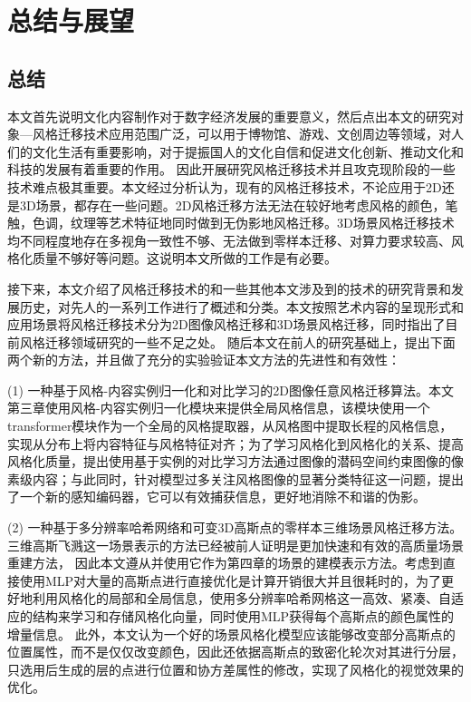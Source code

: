 \chapter{总结与展望}
\section{总结}
本文首先说明文化内容制作对于数字经济发展的重要意义，然后点出本文的研究对象—风格迁移技术应用范围广泛，可以用于博物馆、游戏、文创周边等领域，对人们的文化生活有重要影响，对于提振国人的文化自信和促进文化创新、推动文化和科技的发展有着重要的作用。
因此开展研究风格迁移技术并且攻克现阶段的一些技术难点极其重要。本文经过分析认为，现有的风格迁移技术，不论应用于2D还是3D场景，都存在一些问题。2D风格迁移方法无法在较好地考虑风格的颜色，笔触，色调，纹理等艺术特征地同时做到无伪影地风格迁移。3D场景风格迁移技术均不同程度地存在多视角一致性不够、无法做到零样本迁移、对算力要求较高、风格化质量不够好等问题。这说明本文所做的工作是有必要。
\par 接下来，本文介绍了风格迁移技术的和一些其他本文涉及到的技术的研究背景和发展历史，对先人的一系列工作进行了概述和分类。本文按照艺术内容的呈现形式和应用场景将风格迁移技术分为2D图像风格迁移和3D场景风格迁移，同时指出了目前风格迁移领域研究的一些不足之处。
随后本文在前人的研究基础上，提出下面两个新的方法，并且做了充分的实验验证本文方法的先进性和有效性：

\par (1)  一种基于风格-内容实例归一化和对比学习的2D图像任意风格迁移算法。本文第三章使用风格-内容实例归一化模块来提供全局风格信息，该模块使用一个transformer模块作为一个全局的风格提取器，从风格图中提取长程的风格信息，实现从分布上将内容特征与风格特征对齐；为了学习风格化到风格化的关系、提高风格化质量，提出使用基于实例的对比学习方法通过图像的潜码空间约束图像的像素级内容；与此同时，针对模型过多关注风格图像的显著分类特征这一问题，提出了一个新的感知编码器，它可以有效捕获信息，更好地消除不和谐的伪影。   
\par (2)  一种基于多分辨率哈希网络和可变3D高斯点的零样本三维场景风格迁移方法。
三维高斯飞溅这一场景表示的方法已经被前人证明是更加快速和有效的高质量场景重建方法，
因此本文遵从并使用它作为第四章的场景的建模表示方法。考虑到直接使用MLP对大量的高斯点进行直接优化是计算开销很大并且很耗时的，为了更好地利用风格化的局部和全局信息，使用多分辨率哈希网格这一高效、紧凑、自适应的结构来学习和存储风格化向量，同时使用MLP获得每个高斯点的颜色属性的增量信息。
此外，本文认为一个好的场景风格化模型应该能够改变部分高斯点的位置属性，而不是仅仅改变颜色，因此还依据高斯点的致密化轮次对其进行分层，只选用后生成的层的点进行位置和协方差属性的修改，实现了风格化的视觉效果的优化。

